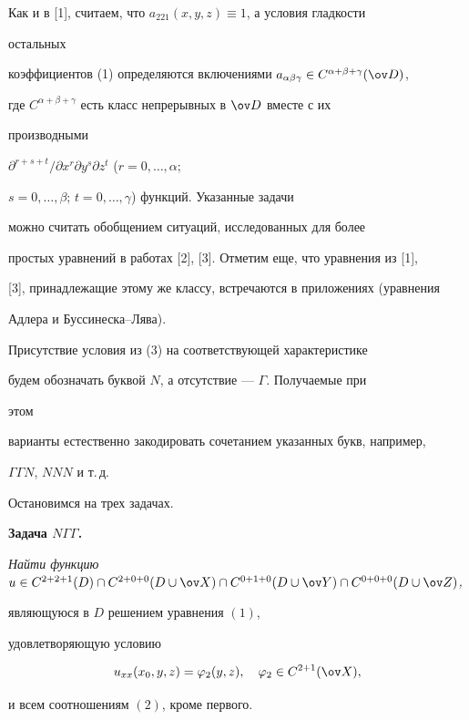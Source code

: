  


Как и в [1], считаем, что $a_{221}(x,y,z)\equiv1$, а условия гладкости 


остальных 


коэффициентов (1) определяются включениями $a_{\alpha\beta\gamma}\in 


C^{\alpha+\beta+\gamma}(\ov D)$, 


где $C^{\alpha+\beta+\gamma}$ есть класс непрерывных в $\ov D$ вместе с их 


производными 


$\partial^{r+s+t}/\partial x^r\partial y^s \partial z^t$ ($r=0,\dotsc,\alpha$; 


$s=0,\dotsc,\beta$; $t=0,\dotsc,\gamma$) функций. Указанные задачи 


можно считать обобщением ситуаций, исследованных для более 


простых уравнений в работах [2], [3]. Отметим еще, что уравнения из [1], 


[3], принадлежащие этому же классу, встречаются в приложениях (уравнения 


Адлера и Буссинеска--Лява). 


 


Присутствие условия из (3) на соответствующей характеристике 


будем обозначать буквой $N$, а отсутствие --- $\varGamma$. Получаемые при 


этом 


варианты естественно закодировать сочетанием указанных букв, например, 


$\varGamma\varGamma N$, $NNN$ и т.\,д. 


 


Остановимся на трех задачах. 


\medskip 


 


{\bf Задача $N\varGamma\varGamma$.} {\it Найти функцию $u\in C^{2+2+1}(D) 


\cap C^{2+0+0}(D\cup\ov X) \cap C^{0+1+0}(D\cup\ov Y) \cap 


C^{0+0+0}(D\cup\ov Z)$, 


являющуюся в $D$ решением уравнения $(1)$, 


удовлетворяющую условию 


$$ 


u_{xx}(x_0,y,z)=\varphi_2(y,z),\quad 


\varphi_2\in C^{2+1}(\ov X),


$$ 


и всем соотношениям $(2)$, кроме первого.} 


